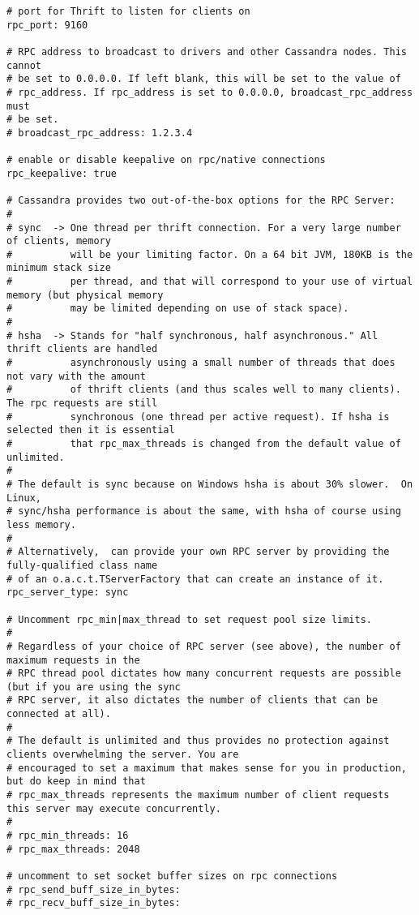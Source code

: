\begin{verbatim}
# port for Thrift to listen for clients on
rpc_port: 9160

# RPC address to broadcast to drivers and other Cassandra nodes. This cannot
# be set to 0.0.0.0. If left blank, this will be set to the value of
# rpc_address. If rpc_address is set to 0.0.0.0, broadcast_rpc_address must
# be set.
# broadcast_rpc_address: 1.2.3.4

# enable or disable keepalive on rpc/native connections
rpc_keepalive: true

# Cassandra provides two out-of-the-box options for the RPC Server:
#
# sync  -> One thread per thrift connection. For a very large number of clients, memory
#          will be your limiting factor. On a 64 bit JVM, 180KB is the minimum stack size
#          per thread, and that will correspond to your use of virtual memory (but physical memory
#          may be limited depending on use of stack space).
#
# hsha  -> Stands for "half synchronous, half asynchronous." All thrift clients are handled
#          asynchronously using a small number of threads that does not vary with the amount
#          of thrift clients (and thus scales well to many clients). The rpc requests are still
#          synchronous (one thread per active request). If hsha is selected then it is essential
#          that rpc_max_threads is changed from the default value of unlimited.
#
# The default is sync because on Windows hsha is about 30% slower.  On Linux,
# sync/hsha performance is about the same, with hsha of course using less memory.
#
# Alternatively,  can provide your own RPC server by providing the fully-qualified class name
# of an o.a.c.t.TServerFactory that can create an instance of it.
rpc_server_type: sync

# Uncomment rpc_min|max_thread to set request pool size limits.
#
# Regardless of your choice of RPC server (see above), the number of maximum requests in the
# RPC thread pool dictates how many concurrent requests are possible (but if you are using the sync
# RPC server, it also dictates the number of clients that can be connected at all).
#
# The default is unlimited and thus provides no protection against clients overwhelming the server. You are
# encouraged to set a maximum that makes sense for you in production, but do keep in mind that
# rpc_max_threads represents the maximum number of client requests this server may execute concurrently.
#
# rpc_min_threads: 16
# rpc_max_threads: 2048

# uncomment to set socket buffer sizes on rpc connections
# rpc_send_buff_size_in_bytes:
# rpc_recv_buff_size_in_bytes:


\end{verbatim}
